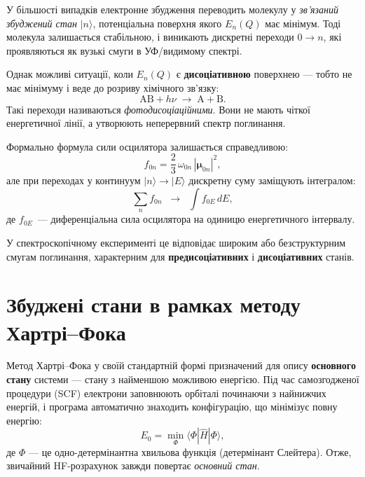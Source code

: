 \begin{commentbox}
    У більшості випадків електронне збудження переводить молекулу у
    \emph{зв’язаний збуджений стан} $|n\rangle$, потенціальна поверхня якого
    $E_n(Q)$ має мінімум. Тоді молекула залишається стабільною,
    і виникають дискретні переходи $0 \to n$, які проявляються
    як вузькі смуги в УФ/видимому спектрі.

    Однак можливі ситуації, коли $E_n(Q)$ є \textbf{дисоціативною} поверхнею ---
    тобто не має мінімуму і веде до розриву хімічного зв’язку:
    \[
        \mathrm{AB} + h\nu \;\longrightarrow\; \mathrm{A} + \mathrm{B}.
    \]
    Такі переходи називаються \emph{фотодисоціаційними}.
    Вони не мають чіткої енергетичної лінії, а утворюють неперервний спектр поглинання.

    Формально формула сили осцилятора залишається справедливою:
    \[
        f_{0n} = \frac{2}{3}\,\omega_{0n}\,|\boldsymbol{\mu}_{0n}|^2,
    \]
    але при переходах у континуум $|n\rangle \to |E\rangle$ дискретну суму
    заміщують інтегралом:
    \[
        \sum_n f_{0n} \;\;\longrightarrow\;\; \int f_{0E}\, dE,
    \]
    де $f_{0E}$~--- диференціальна сила осцилятора на одиницю енергетичного інтервалу.

    У спектроскопічному експерименті це відповідає широким або безструктурним
    смугам поглинання, характерним для \textbf{предисоціативних}
    і \textbf{дисоціативних} станів.
\end{commentbox}



\section{Збуджені стани в рамках методу Хартрі–Фока}

Метод Хартрі–Фока у своїй стандартній формі призначений для опису
\textbf{основного стану} системи --- стану з найменшою можливою енергією.
Під час самозгодженої процедури (SCF) електрони заповнюють орбіталі
починаючи з найнижчих енергій, і програма автоматично знаходить конфігурацію,
що мінімізує повну енергію:
\[
    E_0 = \min_{\Phi} \langle \Phi | \hat{H} | \Phi \rangle,
\]
де $\Phi$ --- це одно-детермінантна хвильова функція (детермінант Слейтера).
Отже, звичайний HF-розрахунок завжди повертає \emph{основний стан}.



